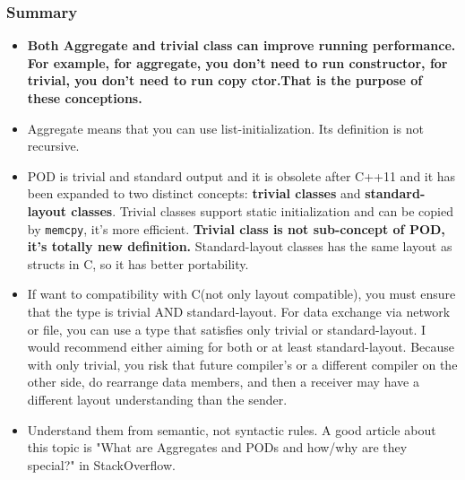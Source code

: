 \documentclass[a4paper,11pt,twoside]{book}
\begin{document}
\subsubsection{Summary}
\begin{itemize}
	\item \textbf{Both Aggregate and trivial class can improve running performance. For example, for aggregate, you don't need to run constructor, for trivial, you don't need to run copy ctor.That is the purpose of these conceptions.}

	\item Aggregate means that you can use list-initialization. Its definition is not recursive.  

	\item POD is trivial and standard output and it is obsolete after C++11 and it has been expanded to two distinct concepts: \textbf{trivial classes} and \textbf{standard-layout classes}. Trivial classes support static initialization and can be copied by \texttt{memcpy}, it's more efficient. \textbf{Trivial class is not sub-concept of POD, it's totally new definition.}  Standard-layout classes has the same layout as structs in C, so it has better portability.
	
	\item If want to compatibility with C(not only layout compatible), you must ensure that the type is trivial AND standard-layout. For data exchange via network or file, you can use a type that satisfies only trivial or standard-layout. I would recommend either aiming for both or at least standard-layout. Because with only trivial, you risk that future compiler's or a different compiler on the other side, do rearrange data members, and then a receiver may have a different layout understanding than the sender.
	
	\item Understand them from semantic, not syntactic rules. A good article about this topic is "What are Aggregates and PODs and how/why are they special?" in StackOverflow. 
\end{itemize}
\end{document}
